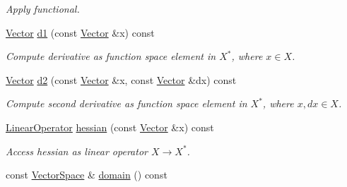 \begin{DoxyCompactItemize}
\begin{DoxyCompactList}\small\item\em \-Apply functional. \end{DoxyCompactList}\item 
\hypertarget{classSpacy_1_1C2Functional_a7278ddf3337cc28d138a02d18ad44404}{\hyperlink{classSpacy_1_1Vector}{\-Vector} \hyperlink{classSpacy_1_1C2Functional_a7278ddf3337cc28d138a02d18ad44404}{d1} (const \hyperlink{classSpacy_1_1Vector}{\-Vector} \&x) const }\label{classSpacy_1_1C2Functional_a7278ddf3337cc28d138a02d18ad44404}

\begin{DoxyCompactList}\small\item\em \-Compute derivative as function space element in $X^*$, where $x\in X$. \end{DoxyCompactList}\item 
\hypertarget{classSpacy_1_1C2Functional_af2f8671e8ebb9079255afc39a495859d}{\hyperlink{classSpacy_1_1Vector}{\-Vector} \hyperlink{classSpacy_1_1C2Functional_af2f8671e8ebb9079255afc39a495859d}{d2} (const \hyperlink{classSpacy_1_1Vector}{\-Vector} \&x, const \hyperlink{classSpacy_1_1Vector}{\-Vector} \&dx) const }\label{classSpacy_1_1C2Functional_af2f8671e8ebb9079255afc39a495859d}

\begin{DoxyCompactList}\small\item\em \-Compute second derivative as function space element in $X^*$, where $x,dx\in X$. \end{DoxyCompactList}\item 
\hypertarget{classSpacy_1_1C2Functional_a97eeeb376ed178ea7e2f109967f99c24}{\hyperlink{classSpacy_1_1LinearOperator}{\-Linear\-Operator} \hyperlink{classSpacy_1_1C2Functional_a97eeeb376ed178ea7e2f109967f99c24}{hessian} (const \hyperlink{classSpacy_1_1Vector}{\-Vector} \&x) const }\label{classSpacy_1_1C2Functional_a97eeeb376ed178ea7e2f109967f99c24}

\begin{DoxyCompactList}\small\item\em \-Access hessian as linear operator $ X \rightarrow X^* $. \end{DoxyCompactList}\item 
\hypertarget{classSpacy_1_1C2Functional_ac75246c876b8bf75cdd4f1264bdb49ae}{const \hyperlink{classSpacy_1_1VectorSpace}{\-Vector\-Space} \& \hyperlink{classSpacy_1_1C2Functional_ac75246c876b8bf75cdd4f1264bdb49ae}{domain} () const }\label{classSpacy_1_1C2Functional_ac75246c876b8bf75cdd4f1264bdb49ae}


\end{DoxyCompactItemize}
